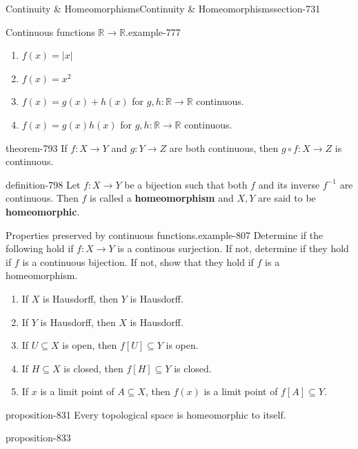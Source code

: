 \documentclass[oneside,10pt,]{article}
\newcommand{\terminology}[1]{\textbf{#1}}
\newcommand{\mb}{\mathbb}
\begin{document}
\begin{sectionptx}{Continuity \& Homeomorphisms}{}{Continuity \& Homeomorphisms}{}{}{section-731}
\begin{example}{Continuous functions \(\mb R\to\mb R\).}{example-777}
\begin{enumerate}
\item\hypertarget{li-783}{}\(f(x)=|x|\)%
\item\hypertarget{li-785}{}\(f(x)=x^2\)%
\item\hypertarget{li-787}{}\(f(x)=g(x)+h(x)\) for \(g,h:\mb R\to\mb R\) continuous.%
\item\hypertarget{li-790}{}\(f(x)=g(x)h(x)\) for \(g,h:\mb R\to\mb R\) continuous.%
\end{enumerate}
\end{example}
\begin{theorem}{}{}{theorem-793}%
\hypertarget{p-794}{}%
If \(f:X\to Y\) and \(g:Y\to Z\) are both continuous, then \(g\circ f:X\to Z\) is continuous.%
\end{theorem}
\begin{definition}{}{definition-798}%
\hypertarget{p-799}{}%
Let \(f:X\to Y\) be a bijection such that both \(f\) and its inverse \(f^{-1}\) are continuous. Then \(f\) is called a \terminology{homeomorphism} and \(X,Y\) are said to be \terminology{homeomorphic}.%
\end{definition}
\begin{example}{Properties preserved by continuous functions.}{example-807}%
\hypertarget{p-809}{}%
Determine if the following hold if \(f:X\to Y\) is a continous surjection. If not, determine if they hold if \(f\) is a continuous bijection. If not, show that they hold if \(f\) is a homeomorphism.%
\leavevmode%
\begin{enumerate}
\item\hypertarget{li-814}{}If \(X\) is Hausdorff, then \(Y\) is Hausdorff.%
\item\hypertarget{li-817}{}If \(Y\) is Hausdorff, then \(X\) is Hausdorff.%
\item\hypertarget{li-820}{}If \(U\subseteq X\) is open, then \(f[U]\subseteq Y\) is open.%
\item\hypertarget{li-823}{}If \(H\subseteq X\) is closed, then \(f[H]\subseteq Y\) is closed.%
\item\hypertarget{li-826}{}If \(x\) is a limit point of \(A\subseteq X\), then \(f(x)\) is a limit point of \(f[A]\subseteq Y\).%
\end{enumerate}
\end{example}
\begin{proposition}{}{}{proposition-831}%
\hypertarget{p-832}{}%
Every topological space is homeomorphic to itself.%
\end{proposition}
\begin{proposition}{}{}{proposition-833}%

\end{proposition}
\end{sectionptx}
\end{document}
